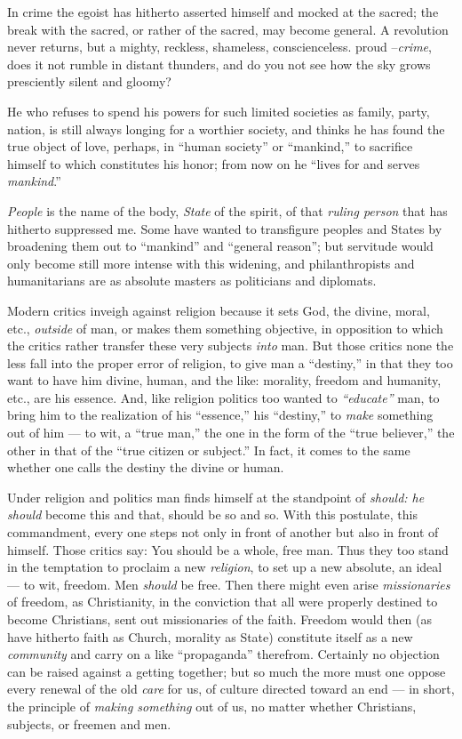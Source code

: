 In crime the egoist has hitherto asserted himself and mocked at the sacred; 
the break with the sacred, or rather of the sacred, may become general. A 
revolution never returns, but a mighty, reckless, shameless, conscienceless. 
proud --\textit{crime}, does it not rumble in distant thunders, and do you not 
see how the sky grows presciently silent and gloomy?

\myhrule


He who refuses to spend his powers for such limited societies as family, 
party, nation, is still always longing for a worthier society, and thinks he 
has found the true object of love, perhaps, in ``human society'' or 
``mankind,'' to sacrifice himself to which constitutes his honor; from now 
on he ``lives for and serves \textit{mankind}.''

\textit{People} is the name of the body, \textit{State} of the spirit, of that 
\textit{ruling person} that has hitherto suppressed me. Some have wanted to 
transfigure peoples and States by broadening them out to ``mankind'' and 
``general reason''; but servitude would only become still more intense with 
this widening, and philanthropists and humanitarians are as absolute masters 
as politicians and diplomats.

Modern critics inveigh against religion because it sets God, the divine, 
moral, etc., \textit{outside} of man, or makes them something objective, in 
opposition to which the critics rather transfer these very subjects 
\textit{into} man. But those critics none the less fall into the proper error 
of religion, to give man a ``destiny,'' in that they too want to have him 
divine, human, and the like: morality, freedom and humanity, etc., are his 
essence. And, like religion politics too wanted to \textit{``educate''} man, 
to bring him to the realization of his ``essence,'' his ``destiny,'' to 
\textit{make} something out of him --- to wit, a ``true man,'' the one in the 
form of the ``true believer,'' the other in that of the ``true citizen or 
subject.'' In fact, it comes to the same whether one calls the destiny the 
divine or human.

Under religion and politics man finds himself at the standpoint of 
\textit{should: he should} become this and that, should be so and so. With 
this postulate, this commandment, every one steps not only in front of another 
but also in front of himself. Those critics say: You should be a whole, free 
man. Thus they too stand in the temptation to proclaim a new 
\textit{religion}, to set up a new absolute, an ideal --- to wit, freedom. Men 
\textit{should} be free. Then there might even arise \textit{missionaries} of 
freedom, as Christianity, in the conviction that all were properly destined to 
become Christians, sent out missionaries of the faith. Freedom would then (as 
have hitherto faith as Church, morality as State) constitute itself as a new 
\textit{community} and carry on a like ``propaganda'' therefrom. Certainly 
no objection can be raised against a getting together; but so much the more 
must one oppose every renewal of the old \textit{care} for us, of culture 
directed toward an end --- in short, the principle of \textit{making something} 
out of us, no matter whether Christians, subjects, or freemen and men.

